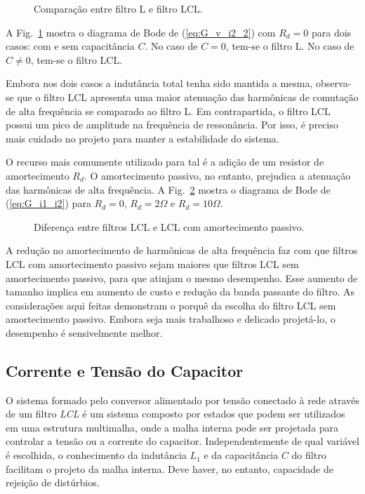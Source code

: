     \begin{figure}[htb]
        \centering{
            \def\svgwidth{\textwidth}
            }
        \caption{Comparação entre filtro L e filtro LCL.}
        \label{fig:L_vs_LCL}
    \end{figure}

    A Fig.~\ref{fig:L_vs_LCL} mostra o diagrama de Bode de (\ref{eq:G_v_i2_2}) com $R_d = 0$ para dois casos: com e sem capacitância $C$. No caso de $C = 0$, tem-se o filtro L. No caso de $C \neq 0$, tem-se o filtro LCL.

    Embora nos dois casos a indutância total tenha sido mantida a mesma, observa-se que o filtro LCL apresenta uma maior atenuação das harmônicas de comutação de alta frequência se comparado ao filtro L. Em contrapartida, o filtro LCL possui um pico de amplitude na frequência de ressonância. Por isso, é preciso mais cuidado no projeto para manter a estabilidade do sistema.

    O recurso mais comumente utilizado para tal é a adição de um resistor de amortecimento $R_d$. O amortecimento passivo, no entanto, prejudica a atenuação das harmônicas de alta frequência. A Fig.~\ref{fig:R_in_LCL} mostra o diagrama de Bode de (\ref{eq:G_i1_i2}) para $R_d = 0$, $R_d = 2\Omega$ e $R_d = 10\Omega$.

    \begin{figure}[htb]
        \centering{
            \def\svgwidth{\textwidth}
            }
        \caption{Diferença entre filtros LCL e LCL com amortecimento passivo.}
        \label{fig:R_in_LCL}
    \end{figure}

    A redução no amortecimento de harmônicas de alta frequência faz com que filtros LCL com amortecimento passivo sejam maiores que filtros LCL sem amortecimento passivo, para que atinjam o mesmo desempenho. Esse aumento de tamanho implica em aumento de custo e redução da banda passante do filtro. As considerações aqui feitas demonstram o porquê da escolha do filtro LCL sem amortecimento passivo. Embora seja mais trabalhoso e delicado projetá-lo, o desempenho é sensivelmente melhor.


\subsection{Corrente e Tensão do Capacitor}

    O sistema formado pelo conversor alimentado por tensão conectado à rede através de um filtro \emph{LCL} é um sistema composto por estados que podem ser utilizados em uma estrutura multimalha, onde a malha interna pode ser projetada para controlar a tensão ou a corrente do capacitor. Independentemente de qual variável é escolhida, o conhecimento da indutância $L_1$ e da capacitância $C$ do filtro facilitam o projeto da malha interna. Deve haver, no entanto, capacidade de rejeição de distúrbios.

